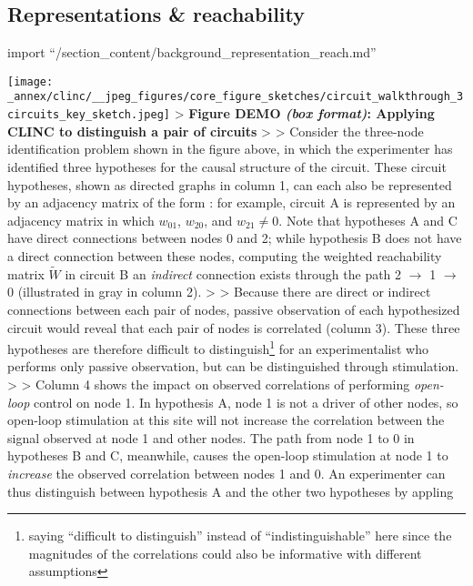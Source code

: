 \hypertarget{representations-reachability}{%
\subsection{Representations \&
reachability}\label{representations-reachability}}

import ``/section\_content/background\_representation\_reach.md''

\texttt{[image: \_annex/clinc/\_\_jpeg\_figures/core\_figure\_sketches/circuit\_walkthrough\_3circuits\_key\_sketch.jpeg]}
\textgreater{} \textbf{Figure DEMO \emph{(box format)}: Applying CLINC
to distinguish a pair of circuits} \textgreater{} \textgreater{}
Consider the three-node identification problem shown in the figure
above, in which the experimenter has identified three hypotheses for the
causal structure of the circuit. These circuit hypotheses, shown as
directed graphs in column 1, can each also be represented by an
adjacency matrix of the form : for example, circuit A is represented by
an adjacency matrix in which \(w_{01}\), \(w_{20}\), and
\(w_{21} \neq 0\). Note that hypotheses A and C have direct connections
between nodes 0 and 2; while hypothesis B does not have a direct
connection between these nodes, computing the weighted reachability
matrix \(\widetilde{W}\) in circuit B an \emph{indirect} connection
exists through the path 2 \(\to\) 1 \(\to\) 0 (illustrated in gray in
column 2). \textgreater{} \textgreater{} Because there are direct or
indirect connections between each pair of nodes, passive observation of
each hypothesized circuit would reveal that each pair of nodes is
correlated (column 3). These three hypotheses are therefore difficult to
distinguish\footnote{saying ``difficult to distinguish'' instead of
  ``indistinguishable'' here since the magnitudes of the correlations
  could also be informative with different assumptions} for an
experimentalist who performs only passive observation, but can be
distinguished through stimulation. \textgreater{} \textgreater{} Column
4 shows the impact on observed correlations of performing
\emph{open-loop} control on node 1. In hypothesis A, node 1 is not a
driver of other nodes, so open-loop stimulation at this site will not
increase the correlation between the signal observed at node 1 and other
nodes. The path from node 1 to 0 in hypotheses B and C, meanwhile,
causes the open-loop stimulation at node 1 to \emph{increase} the
observed correlation between nodes 1 and 0. An experimenter can thus
distinguish between hypothesis A and the other two hypotheses by appling

